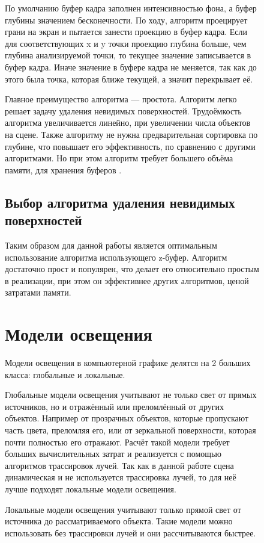 \begin{figure}[h]
По умолчанию буфер кадра заполнен интенсивностью фона, а буфер глубины значением бесконечности.
По ходу, алгоритм проецирует грани на экран и пытается занести проекцию в буфер кадра. Если для соответствующих x и y точки проекцию глубина больше, чем глубина анализируемой точки, то текущее значение записывается в буфер кадра. Иначе значение в буфере кадра не меняется, так как до этого была точка, которая ближе текущей, а значит перекрывает её.

Главное преимущество алгоритма — простота. Алгоритм легко решает задачу удаления невидимых поверхностей. Трудоёмкость алгоритма увеличивается линейно, при увеличении числа объектов на сцене. Также алгоритму не нужна предварительная сортировка по глубине, что повышает его эффективность, по сравнению с другими алгоритмами. Но при этом алгоритм требует большего объёма памяти, для хранения буферов \cite{rodgers}.

\subsection{Выбор алгоритма удаления невидимых поверхностей}


Таким образом для данной работы является оптимальным использование алгоритма использующего z-буфер. Алгоритм достаточно прост и популярен, что делает его относительно простым в реализации, при этом он эффективнее других алгоритмов, ценой затратами памяти.


\section{Модели освещения}
Модели освещения в компьютерной графике делятся на 2 больших класса: глобальные и локальные.

Глобальные модели освещения учитывают не только свет от прямых источников, но и отражённый или преломлённый от других объектов. Например от прозрачных объектов, которые пропускают часть цвета, преломляя его, или от зеркальной поверхности, которая почти полностью его отражают. Расчёт такой модели требует больших вычислительных затрат и реализуется с помощью алгоритмов трассировок лучей. Так как в данной работе сцена динамическая и не используется трассировка лучей, то для неё лучше подходят локальные модели освещения.

Локальные модели освещения учитывают только прямой свет от источника до рассматриваемого объекта. Такие модели можно использовать без трассировки лучей и они рассчитываются быстрее.


\end{figure}
